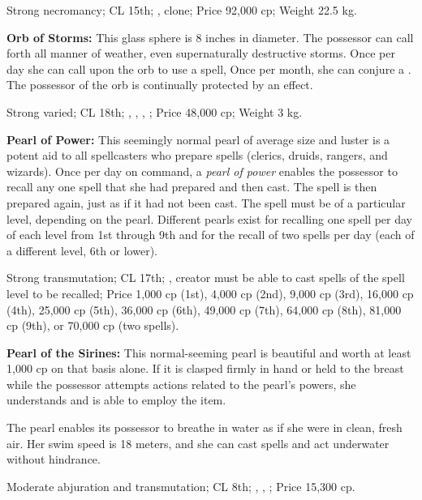 Strong necromancy; CL 15th; , clone; Price 92,000 cp; Weight 22.5 kg.



\textbf{Orb of Storms:} This glass sphere is 8 inches in diameter. The possessor can call forth all manner of weather, even supernaturally destructive storms. Once per day she can call upon the orb to use a  spell, Once per month, she can conjure a . The possessor of the orb is continually protected by an  effect.

Strong varied; CL 18th; , , , ; Price 48,000 cp; Weight 3 kg.



\textbf{Pearl of Power:} This seemingly normal pearl of average size and luster is a potent aid to all spellcasters who prepare spells (clerics, druids, rangers, and wizards). Once per day on command, a \emph{pearl of power} enables the possessor to recall any one spell that she had prepared and then cast. The spell is then prepared again, just as if it had not been cast. The spell must be of a particular level, depending on the pearl. Different pearls exist for recalling one spell per day of each level from 1st through 9th and for the recall of two spells per day (each of a different level, 6th or lower).

Strong transmutation; CL 17th; , creator must be able to cast spells of the spell level to be recalled; Price 1,000 cp (1st), 4,000 cp (2nd), 9,000 cp (3rd), 16,000 cp (4th), 25,000 cp (5th), 36,000 cp (6th), 49,000 cp (7th), 64,000 cp (8th), 81,000 cp (9th), or 70,000 cp (two spells).



\textbf{Pearl of the Sirines:} This normal-seeming pearl is beautiful and worth at least 1,000 cp on that basis alone. If it is clasped firmly in hand or held to the breast while the possessor attempts actions related to the pearl's powers, she understands and is able to employ the item.

The pearl enables its possessor to breathe in water as if she were in clean, fresh air. Her swim speed is 18 meters, and she can cast spells and act underwater without hindrance.

Moderate abjuration and transmutation; CL 8th; , , ; Price 15,300 cp.



